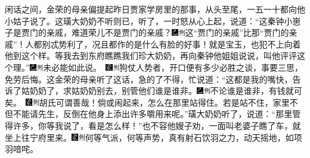 闲话之间，金荣的母亲偏提起昨日贾家学房里的那事，从头至尾，一五一十都向他小姑子说了。这璜大奶奶不听则已，听了，一时怒从心上起，说道：``这秦钟小崽子是贾门的亲戚，难道荣儿不是贾门的亲戚？{\includegraphics[width=3mm]{../Images/00003}\includegraphics[width=3mm]{../Images/00011}\footnotesize \kaishu 这``贾门的亲戚''比那``贾门的亲戚''！}人都别忒势利了，况且都作的是什么有脸的好事！就是宝玉，也犯不上向着他到这个样。等我去到东府瞧瞧我们珍大奶奶，再向秦钟他姐姐说说，叫他评评这个理。''{\includegraphics[width=3mm]{../Images/00003}\includegraphics[width=3mm]{../Images/00011}\footnotesize \kaishu 未必能如此说。　\includegraphics[width=3mm]{../Images/00006}\includegraphics[width=3mm]{../Images/00011}\footnotesize \kaishu 狗仗人势者，开口便有多少必胜之谈，事要三思，免劳后悔。}这金荣的母亲听了这话，急的了不得，忙说道：``这都是我的嘴快，告诉了姑奶奶了，求姑奶奶别去，别管他们谁是谁非。{\includegraphics[width=3mm]{../Images/00003}\includegraphics[width=3mm]{../Images/00011}\footnotesize \kaishu 不论谁是谁非，有钱就可矣。　\includegraphics[width=3mm]{../Images/00006}\includegraphics[width=3mm]{../Images/00011}\footnotesize \kaishu 胡氏可谓善哉！}倘或闹起来，怎么在那里站得住。若是站不住，家里不但不能请先生，反倒在他身上添出许多嚼用来呢。''璜大奶奶听了，说道：``那里管得许多，你等我说了，看是怎么样！''也不容他嫂子劝，一面叫老婆子瞧了车，就坐上往宁府里来。{\includegraphics[width=3mm]{../Images/00006}\includegraphics[width=3mm]{../Images/00011}\footnotesize \kaishu 何等气派，何等声势，真有射石饮羽之力，动天摇地，如项羽喑咤。}

